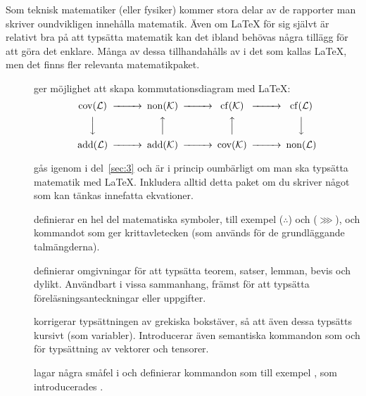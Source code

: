 \documentclass[lang=sv,ptsize=10pt,font=none,nomath,titles=bf,../../a4.tex]{subfiles}
\begin{document}
Som teknisk matematiker (eller fysiker) kommer stora delar av de rapporter
man skriver oundvikligen innehålla matematik. Även om \LaTeX{} för sig
självt är relativt bra på att typsätta matematik kan det ibland behövas
några tillägg för att göra det enklare. Många av dessa tillhandahålls av
\AmS{} i det som kallas \AmS\LaTeX, men det finns fler relevanta
matematikpaket.

\begin{description}
	\item[]
	ger möjlighet att skapa kommutationsdiagram med \LaTeX:
	\begin{equation*}
		\begin{CD}
			\cov(\mathcal{L}) @>>> \non(\mathcal{K}) @>>> \cf(\mathcal{K}) @>>> \cf(\mathcal{L})\\
			@VVV @AAA @AAA @VVV\\
			\add(\mathcal{L}) @>>> \add(\mathcal{K}) @>>> \cov(\mathcal{K}) @>>> \non(\mathcal{L})
		\end{CD}
	\end{equation*}
	
	\item[]
	gås igenom i del~\ref{sec:3} och är i princip oumbärligt om man ska
	typsätta matematik med \LaTeX. Inkludera alltid detta paket om du
	skriver något som kan tänkas innefatta ekvationer.

	\item[]
	definierar en hel del matematiska symboler, till exempel 
	 (\(\therefore\)) och  (\(\ggg\)), och 
	kommandot  som ger krittavletecken (som
	används för de grundläggande talmängderna).
	
	\item[]
	definierar omgivningar för att typsätta teorem, satser, lemman, bevis
	och dylikt. Användbart i vissa sammanhang, främst för att typsätta
	föreläsningsanteckningar eller uppgifter. 
	
	\item[]
	korrigerar typsättningen av grekiska bokstäver, så att även dessa typsätts
	kursivt (som variabler). Introducerar även semantiska kommandon som
	 och  för typsättning av vektorer
	och tensorer.
	
	\item[]
	lagar några småfel i  och definierar kommandon som till
	exempel , som introducerades
	.
\end{description}
\end{document}
